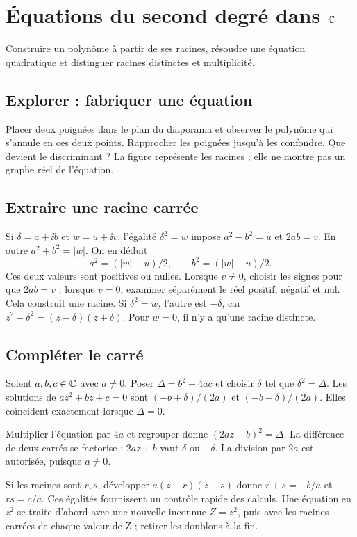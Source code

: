 \clearpage
\section{Équations du second degré dans \texorpdfstring{$\mathbb{C}$}{C}}
\begin{objectif}
Construire un polynôme à partir de ses racines, résoudre une équation quadratique et distinguer racines distinctes et multiplicité.
\end{objectif}
\subsection{Explorer : fabriquer une équation}
Placer deux poignées dans le plan du diaporama et observer le polynôme qui s'annule en ces deux points. Rapprocher les poignées jusqu'à les confondre. Que devient le discriminant ? La figure représente les racines ; elle ne montre pas un graphe réel de l'équation.
\subsection{Extraire une racine carrée}
Si $\delta=a+\ii b$ et $w=u+\ii v$, l'égalité $\delta^2=w$ impose $a^2-b^2=u$ et $2ab=v$. En outre $a^2+b^2=|w|$. On en déduit
\[a^2=(|w|+u)/2,\qquad b^2=(|w|-u)/2.\]
Ces deux valeurs sont positives ou nulles. Lorsque $v\ne0$, choisir les signes pour que $2ab=v$ ; lorsque $v=0$, examiner séparément le réel positif, négatif et nul. Cela construit une racine. Si $\delta^2=w$, l'autre est $-\delta$, car $z^2-\delta^2=(z-\delta)(z+\delta)$. Pour $w=0$, il n'y a qu'une racine distincte.
\subsection{Compléter le carré}
\begin{theoreme}
Soient $a,b,c\in\mathbb{C}$ avec $a\ne0$. Poser $\Delta=b^2-4ac$ et choisir $\delta$ tel que $\delta^2=\Delta$. Les solutions de $az^2+bz+c=0$ sont $(-b+\delta)/(2a)$ et $(-b-\delta)/(2a)$. Elles coïncident exactement lorsque $\Delta=0$.
\end{theoreme}
\begin{demonstration}
Multiplier l'équation par $4a$ et regrouper donne $(2az+b)^2=\Delta$. La différence de deux carrés se factorise : $2az+b$ vaut $\delta$ ou $-\delta$. La division par $2a$ est autorisée, puisque $a\ne0$.
\end{demonstration}
Si les racines sont $r,s$, développer $a(z-r)(z-s)$ donne $r+s=-b/a$ et $rs=c/a$. Ces égalités fournissent un contrôle rapide des calculs. Une équation en $z^2$ se traite d'abord avec une nouvelle inconnue $Z=z^2$, puis avec les racines carrées de chaque valeur de Z ; retirer les doublons à la fin.
